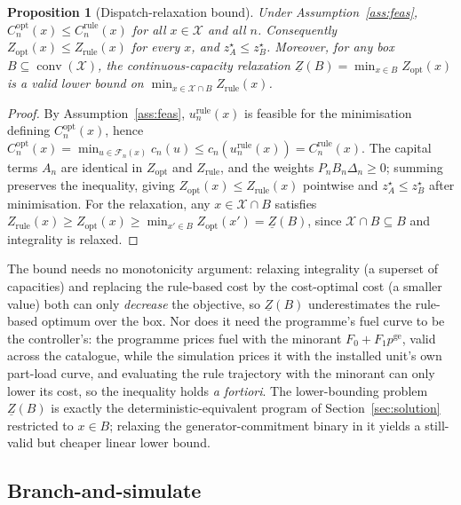 \documentclass[11pt,a4paper]{article}
\theoremstyle{plain}
\newtheorem{proposition}{Proposition}
\theoremstyle{definition}
\begin{document}
\begin{proposition}[Dispatch-relaxation bound]
\label{prop:bound}
Under Assumption~\ref{ass:feas}, $C^{\mathrm{opt}}_n(x)\le C^{\mathrm{rule}}_n(x)$ for all
$x\in\mathcal{X}$ and all $n$. Consequently $Z_{\mathrm{opt}}(x)\le Z_{\mathrm{rule}}(x)$
for every $x$, and $z_A^\star\le z_B^\star$. Moreover, for any box
$B\subseteq\operatorname{conv}(\mathcal{X})$, the continuous-capacity relaxation
$\underline{Z}(B)=\min_{x\in B}Z_{\mathrm{opt}}(x)$ is a valid lower bound on
$\min_{x\in\mathcal{X}\cap B} Z_{\mathrm{rule}}(x)$.
\end{proposition}

\begin{proof}
By Assumption~\ref{ass:feas}, $u^{\mathrm{rule}}_n(x)$ is feasible for the minimisation
defining $C^{\mathrm{opt}}_n(x)$, hence
$C^{\mathrm{opt}}_n(x)=\min_{u\in\mathcal{F}_n(x)}c_n(u)\le
c_n(u^{\mathrm{rule}}_n(x))=C^{\mathrm{rule}}_n(x)$. The capital terms $A_n$ are identical
in $Z_{\mathrm{opt}}$ and $Z_{\mathrm{rule}}$, and the weights
$P_n B_n\Delta_n\ge0$; summing preserves the inequality, giving
$Z_{\mathrm{opt}}(x)\le Z_{\mathrm{rule}}(x)$ pointwise and $z_A^\star\le z_B^\star$ after
minimisation. For the relaxation, any $x\in\mathcal{X}\cap B$ satisfies
$Z_{\mathrm{rule}}(x)\ge Z_{\mathrm{opt}}(x)\ge\min_{x'\in B}Z_{\mathrm{opt}}(x')
=\underline{Z}(B)$, since $\mathcal{X}\cap B\subseteq B$ and integrality is relaxed.
\end{proof}

The bound needs no monotonicity argument: relaxing integrality (a superset of capacities)
and replacing the rule-based cost by the cost-optimal cost (a smaller value) both can only
\emph{decrease} the objective, so $\underline{Z}(B)$ underestimates the rule-based optimum
over the box. Nor does it need the programme's fuel curve to be the controller's: the
programme prices fuel with the minorant $F_0+F_1p^{\mathrm{ge}}$, valid across the
catalogue, while the simulation prices it with the installed unit's own part-load curve, and
evaluating the rule trajectory with the minorant can only lower its cost, so the inequality
holds \emph{a fortiori}. The lower-bounding problem $\underline{Z}(B)$ is exactly the
deterministic-equivalent program of Section~\ref{sec:solution} restricted to $x\in B$;
relaxing the generator-commitment binary in it yields a still-valid but cheaper linear
lower bound.

\subsection{Branch-and-simulate}
\end{document}
